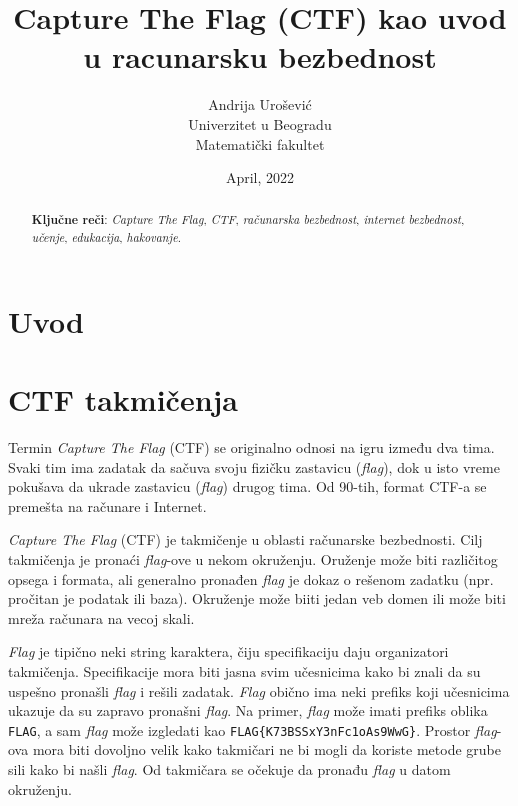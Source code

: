 \documentclass[12pt, a4paper, twocolumn]{article}
\title{Capture The Flag (CTF) kao uvod u racunarsku bezbednost}
\author{Andrija Urošević\\Univerzitet u Beogradu\\Matematički fakultet}
\date{April, 2022}
\begin{document}
\maketitle

\begin{abstract}
    \textbf{Ključne reči}: \emph{Capture The Flag}, \emph{CTF}, 
    \emph{računarska bezbednost}, \emph{internet bezbednost}, \emph{učenje}, 
    \emph{edukacija}, \emph{hakovanje}.
\end{abstract}

\section{Uvod}

\section{CTF takmičenja}

Termin \emph{Capture The Flag} (CTF) se originalno odnosi na igru između dva
tima. Svaki tim ima zadatak da sačuva svoju fizičku zastavicu (\emph{flag}), 
dok u isto vreme pokušava da ukrade zastavicu (\emph{flag}) drugog tima.
Od 90-tih, format CTF-a se premešta na računare i Internet. 

\emph{Capture The Flag} (CTF) je takmičenje u oblasti računarske bezbednosti.
Cilj takmičenja je pronaći \emph{flag}-ove u nekom okruženju. Oruženje može
biti različitog opsega i formata, ali generalno pronađen \emph{flag} je dokaz
o rešenom zadatku (npr. pročitan je podatak ili baza). Okruženje može biiti
jedan veb domen ili može biti mreža računara na vecoj skali.

\emph{Flag} je tipično neki string karaktera, čiju specifikaciju daju
organizatori takmičenja. Specifikacije mora biti jasna svim učesnicima kako 
bi znali da su uspešno pronašli \emph{flag} i rešili zadatak. \emph{Flag}
obično ima neki prefiks koji učesnicima ukazuje da su zapravo pronašni 
\emph{flag}. Na primer, \emph{flag} može imati prefiks oblika \texttt{FLAG},
a sam \emph{flag} može izgledati kao \texttt{FLAG\{K73BSSxY3nFc1oAs9WwG\}}.
Prostor \emph{flag}-ova mora biti dovoljno velik kako takmičari ne bi mogli
da koriste metode grube sili kako bi našli \emph{flag}. Od takmičara se 
očekuje da pronađu \emph{flag} u datom okruženju.
\end{document}

